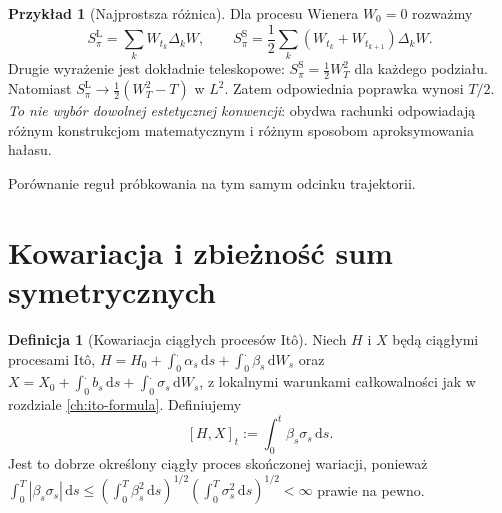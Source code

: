 \documentclass[11pt,a4paper,oneside]{report}
\numberwithin{equation}{chapter}
\theoremstyle{plain}
\theoremstyle{definition}
\newtheorem{definicja}{Definicja}[chapter]
\newtheorem{przyklad}{Przykład}[chapter]
\theoremstyle{remark}
\newcommand{\dd}{\mathrm{d}}
\begin{document}
\begin{przyklad}[Najprostsza różnica]
Dla procesu Wienera $W_0=0$ rozważmy
\[
S_\pi^{\mathrm L}=\sum_kW_{t_k}\Delta_kW,
\qquad
S_\pi^{\mathrm S}=
\frac12\sum_k(W_{t_k}+W_{t_{k+1}})\Delta_kW.
\]
Drugie wyrażenie jest dokładnie teleskopowe:
$S_\pi^{\mathrm S}=\frac12W_T^2$ dla każdego podziału.
Natomiast $S_\pi^{\mathrm L}\to\frac12(W_T^2-T)$
w $L^2$. Zatem odpowiednia poprawka wynosi $T/2$.
\emph{To nie wybór dowolnej estetycznej konwencji}:
obydwa rachunki odpowiadają różnym konstrukcjom
matematycznym i różnym sposobom aproksymowania hałasu.
\end{przyklad}

\begin{center}
\par\smallskip\small Porównanie reguł próbkowania na tym samym odcinku trajektorii.
\end{center}

\section{Kowariacja i zbieżność sum symetrycznych}
\begin{definicja}[Kowariacja ciągłych procesów Itô]
Niech $H$ i $X$ będą ciągłymi procesami Itô,
$H=H_0+\int_0^.\alpha_s\,\dd s+
\int_0^.\beta_s\,\dd W_s$ oraz
$X=X_0+\int_0^.b_s\,\dd s+
\int_0^.\sigma_s\,\dd W_s$,
z lokalnymi warunkami całkowalności jak w
rozdziale \ref{ch:ito-formula}. Definiujemy
\[
[H,X]_t:=\int_0^t\beta_s\sigma_s\,\dd s.
\tag{4.1}\label{eq:HX-bracket}
\]
Jest to dobrze określony ciągły proces skończonej
wariacji, ponieważ
$\int_0^T|\beta_s\sigma_s|\,\dd s
\le(\int_0^T\beta_s^2\,\dd s)^{1/2}
(\int_0^T\sigma_s^2\,\dd s)^{1/2}<\infty$
prawie na pewno.
\end{definicja}
\end{document}
